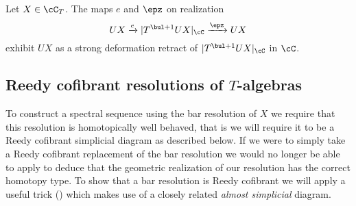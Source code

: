 \documentclass[leqno,oneside,english]{elsarticle}
\begin{document}
\begin{lem}{\cite[Prop.~9.8]{May72}}\label{lem:simp-retraction}
  Let $X \in \cC_T$. The maps $e$ and $\epz$ on realization
  \[
  UX
  \xrightarrow{e} 
  |T^{\bul +1} UX|_\cC
  \xrightarrow{\epz} 
  UX
  \]
  exhibit $UX$ as a strong deformation retract
  of $|T^{\bul +1} UX|_\cC$ in $\cC$.
\end{lem}
{{\ifshowsaveblocks
{}
\fi}}{}

\subsection{Reedy cofibrant resolutions of \texorpdfstring{$T$}{T}-algebras}\label{sec:reedy}
To construct a spectral sequence using the bar resolution of $X$ we
require that this resolution is homotopically well behaved, that is we
will require it to be a Reedy cofibrant simplicial diagram as described below. If
we were to simply take a Reedy cofibrant replacement of the bar resolution we would no
longer be able to apply  to deduce that the
geometric realization of our resolution has the correct homotopy type.
To show that a bar resolution is Reedy cofibrant we will apply a useful trick
() which makes use of a closely related \emph{almost
simplicial} diagram.
\end{document}
